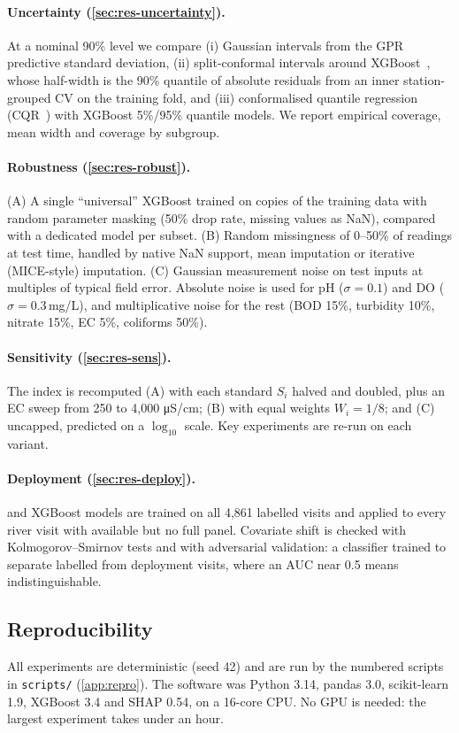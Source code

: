 \paragraph{Uncertainty (\cref{sec:res-uncertainty}).} At a nominal 90\% level we compare (i) Gaussian intervals from the GPR predictive standard deviation, (ii) split-conformal intervals around XGBoost~\citep{vovk2005,barber2021}, whose half-width is the 90\% quantile of absolute residuals from an inner station-grouped CV on the training fold, and (iii) conformalised quantile regression (CQR~\citep{romano2019}) with XGBoost 5\%/95\% quantile models. We report empirical coverage, mean width and coverage by subgroup.

\paragraph{Robustness (\cref{sec:res-robust}).} (A) A single ``universal'' XGBoost trained on copies of the training data with random parameter masking (50\% drop rate, missing values as NaN), compared with a dedicated model per subset. (B) Random missingness of 0--50\% of readings at test time, handled by native NaN support, mean imputation or iterative (MICE-style) imputation. (C) Gaussian measurement noise on test inputs at multiples of typical field error. Absolute noise is used for pH ($\sigma=0.1$) and DO ($\sigma=0.3$\,mg/L), and multiplicative noise for the rest (BOD 15\%, turbidity 10\%, nitrate 15\%, EC 5\%, coliforms 50\%).

\paragraph{Sensitivity (\cref{sec:res-sens}).} The index is recomputed (A) with each standard $S_i$ halved and doubled, plus an EC sweep from 250 to 4,000 \si{\micro S/cm}; (B) with equal weights $W_i=1/8$; and (C) uncapped, predicted on a $\log_{10}$ scale. Key experiments are re-run on each variant.

\paragraph{Deployment (\cref{sec:res-deploy}).}  and  XGBoost models are trained on all 4,861 labelled visits and applied to every river visit with  available but no full panel. Covariate shift is checked with Kolmogorov--Smirnov tests and with adversarial validation: a classifier trained to separate labelled from deployment visits, where an AUC near 0.5 means indistinguishable.

\subsection{Reproducibility}

All experiments are deterministic (seed 42) and are run by the numbered scripts in \texttt{scripts/} (\cref{app:repro}). The software was Python 3.14, pandas 3.0, scikit-learn 1.9, XGBoost 3.4 and SHAP 0.54, on a 16-core CPU. No GPU is needed: the largest experiment takes under an hour.
